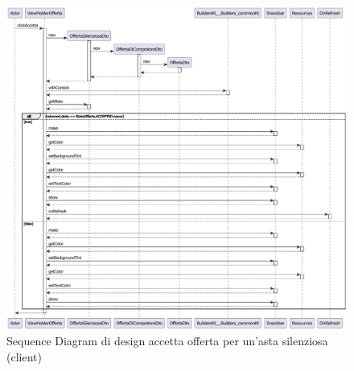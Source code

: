        \begin{figure}[htbp!]
            \centering
                \includegraphics[width=1\linewidth]{Immagini/Diagrammi/Sequence Diagram/Client Sequence Design/ClientSequenceAccettaOffertaDesign.pdf}
            \caption{Sequence Diagram di design accetta offerta per un'asta silenziosa (client)}
            \label{fig:Sequence Diagram di design accetta offerta per un'asta silenziosa (client)}
        \end{figure}
